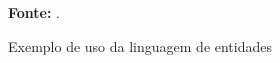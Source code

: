 \begin{figure}[h!]
\centering

\caption{\textmd{Exemplo de uso da linguagem de entidades}}
\label{fig:xtextprograma}

\par\medskip\textbf{Fonte:} . \par\medskip
\end{figure}
